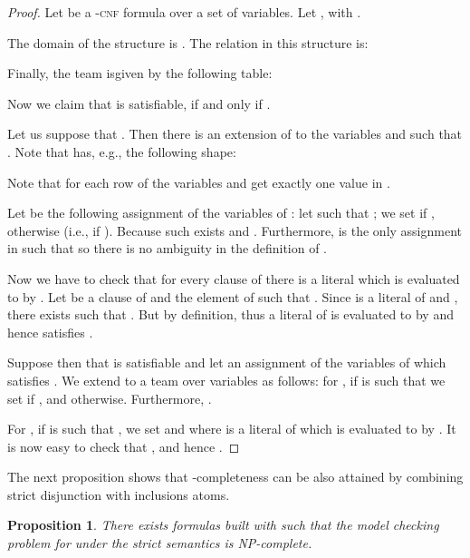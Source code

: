 \documentclass{article}
\theoremstyle{plain}
\newtheorem{proposition}[theorem]{Proposition}
\theoremstyle{definition}
\newcommand{\pb}[1]{\textsc{#1}}
\begin{document}
\begin{proof}
	Let  be a -\pb{cnf} formula over a set  of variables. Let , with .
	
	The domain of the structure  is . The relation  in this structure is:
	
	
	
	Finally, the team  isgiven by the following table: 
		
	
	Now we claim that  is satisfiable, if and only if .
	
Let us suppose that . Then there is an extension  of  to the variables  and  such that 
		. Note that  
	 has, e.g.,  the following shape:
		

Note that for each row of  the variables  and  get exactly one value in .

Let  be the following assignment  of the variables of : let   such that ; we set  if ,  otherwise (i.e., if ). Because  such  exists and . Furthermore,  is the only assignment in  such that  so there is no ambiguity in the definition of .
		
Now we have to check that for every  clause of  there is a literal which is evaluated to  by . Let  be a clause of  and  the element of  such that .  Since  is a literal of  and  , there exists  such that . But  by definition, thus a literal of  is evaluated to  by  and hence  satisfies .
	
Suppose then that  is satisfiable and let  an assignment of the variables of  which satisfies . We extend  to a team  over variables  as follows: for , if  is such that  we set  if , and   otherwise. Furthermore, .
		
		For , if  is such that , we set  and  where  is a literal of  which is evaluated to  by . It is now easy to check that 
		, and hence  . 
\end{proof}

The next proposition shows that -completeness can be also attained by combining strict disjunction with inclusions atoms.
\begin{proposition}\label{StrictInc2}
	There exists formulas  built with  such that the model checking problem for  under the strict semantics is NP-complete.
	
\end{proposition}
\end{document}
